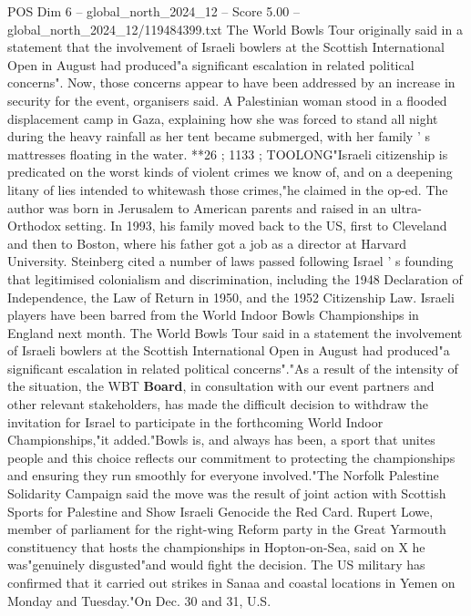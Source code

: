 \begin{textsample}{POS Dim 6 – global\_north\_2024\_12 – Score 5.00 – global\_north\_2024\_12/119484399.txt}  \label{ex:f6_pos_264}
The World Bowls Tour originally said in a statement that the involvement of Israeli bowlers at the Scottish International Open in August had produced"a significant escalation in related political concerns".
Now, those concerns appear to have been addressed by an increase in security for the event, organisers said.
A Palestinian woman stood in a flooded displacement camp in Gaza, explaining how she was forced to stand all night during the heavy rainfall as her tent became submerged, with her family ' s mattresses floating in the water. **26 ; 1133 ; TOOLONG"Israeli citizenship is predicated on the worst kinds of violent crimes we know of, and on a deepening litany of lies intended to whitewash those crimes,"he claimed in the op-ed.
The author was born in Jerusalem to American parents and raised in an ultra-Orthodox setting.
In 1993, his family moved back to the US, first to Cleveland and then to Boston, where his father got a job as a director at Harvard University.
Steinberg cited a number of laws passed following Israel ' s founding that legitimised colonialism and discrimination, including the 1948 Declaration of Independence, the Law of Return in 1950, and the 1952 Citizenship Law.
Israeli players have been barred from the World Indoor Bowls Championships in England next month.
The World Bowls Tour said in a statement the involvement of Israeli bowlers at the Scottish International Open in August had produced"a significant escalation in related political concerns"."As a result of the intensity of the situation, the WBT \textbf{Board}, in consultation with our event partners and other relevant stakeholders, has made the difficult decision to withdraw the invitation for Israel to participate in the forthcoming World Indoor Championships,"it added."Bowls is, and always has been, a sport that unites people and this choice reflects our commitment to protecting the championships and ensuring they run smoothly for everyone involved."The Norfolk Palestine Solidarity Campaign said the move was the result of joint action with Scottish Sports for Palestine and Show Israeli Genocide the Red Card.
Rupert Lowe, member of parliament for the right-wing Reform party in the Great Yarmouth constituency that hosts the championships in Hopton-on-Sea, said on X he was"genuinely disgusted"and would fight the decision.
The US military has confirmed that it carried out strikes in Sanaa and coastal locations in Yemen on Monday and Tuesday."On Dec. 30 and 31, U.S.

\end{textsample}
